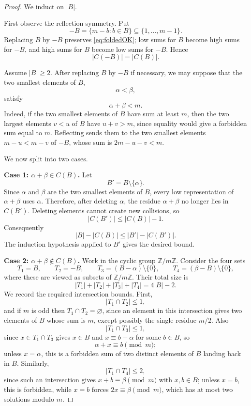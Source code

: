 \documentclass[10pt,a4paper]{amsart}
\newcommand{\Z}{\mathbb{Z}}
\begin{document}
\begin{proof}
We induct on $|B|$.

First observe the reflection symmetry. Put
\[
  -B=\{m-b:b\in B\}\subseteq \{1,\ldots,m-1\}.
\]
Replacing $B$ by $-B$ preserves \eqref{eq:foldedOK}; low sums for $B$ become high sums for $-B$, and high sums for $B$ become low sums for $-B$. Hence
\begin{equation}\label{eq:collision-reflection}
  |C(-B)|=|C(B)|.
\end{equation}

Assume $|B|\geq 2$. After replacing $B$ by $-B$ if necessary, we may suppose that the two smallest elements of $B$,
\[
  \alpha<\beta,
\]
satisfy
\begin{equation}\label{eq:small-sum}
  \alpha+\beta<m.
\end{equation}
Indeed, if the two smallest elements of $B$ have sum at least $m$, then the two largest elements $v<u$ of $B$ have $u+v>m$, since equality would give a forbidden sum equal to $m$. Reflecting sends them to the two smallest elements $m-u<m-v$ of $-B$, whose sum is $2m-u-v<m$.

We now split into two cases.

\smallskip
\noindent\textbf{Case 1: $\alpha+\beta\in C(B)$.}
Let
\[
  B'=B\setminus\{\alpha\}.
\]
Since $\alpha$ and $\beta$ are the two smallest elements of $B$, every low representation of $\alpha+\beta$ uses $\alpha$. Therefore, after deleting $\alpha$, the residue $\alpha+\beta$ no longer lies in $C(B')$. Deleting elements cannot create new collisions, so
\[
  |C(B')|\leq |C(B)|-1.
\]
Consequently
\[
  |B|-|C(B)|\leq |B'|-|C(B')|.
\]
The induction hypothesis applied to $B'$ gives the desired bound.

\smallskip
\noindent\textbf{Case 2: $\alpha+\beta\notin C(B)$.}
Work in the cyclic group $\Z/m\Z$. Consider the four sets
\[
  T_1=B,
  \qquad
  T_2=-B,
  \qquad
  T_3=(B-\alpha)\setminus\{0\},
  \qquad
  T_4=(\beta-B)\setminus\{0\},
\]
where these are viewed as subsets of $\Z/m\Z$. Their total size is
\begin{equation}\label{eq:four-total}
  |T_1|+|T_2|+|T_3|+|T_4|=4|B|-2.
\end{equation}
We record the required intersection bounds. First,
\[
  |T_1\cap T_2|\leq 1,
\]
and if $m$ is odd then $T_1\cap T_2=\varnothing$, since an element in this intersection gives two elements of $B$ whose sum is $m$, except possibly the single residue $m/2$. Also
\[
  |T_1\cap T_3|\leq 1,
\]
since $x\in T_1\cap T_3$ gives $x\in B$ and $x\equiv b-\alpha$ for some $b\in B$, so
\[
  \alpha+x\equiv b\pmod m;
\]
unless $x=\alpha$, this is a forbidden sum of two distinct elements of $B$ landing back in $B$. Similarly,
\[
  |T_1\cap T_4|\leq 2,
\]
since such an intersection gives $x+b\equiv \beta\pmod m$ with $x,b\in B$; unless $x=b$, this is forbidden, while $x=b$ forces $2x\equiv \beta\pmod m$, which has at most two solutions modulo $m$.


\end{proof}
\end{document}

